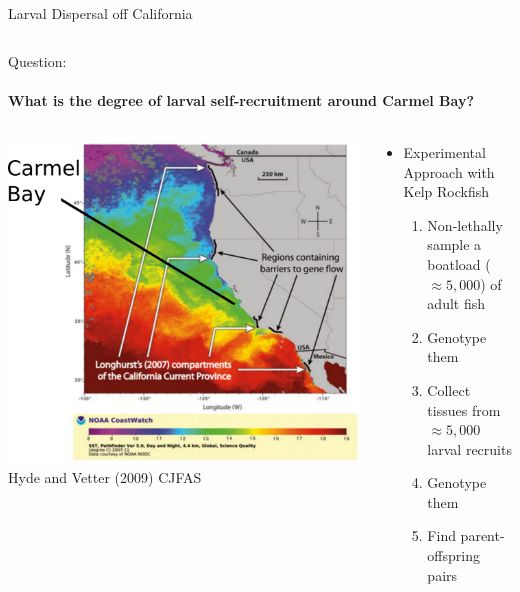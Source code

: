 \documentclass[letter,graphicx]{beamer}
\begin{document}
\begin{frame}{Larval Dispersal off California}
\begin{columns}
\begin{column}{0.55\textwidth}
\begin{itemize}
\end{itemize}

\end{column}
\end{columns}


\end{frame}








\begin{frame}{Question:}
\framesubtitle{What is the degree of larval self-recruitment around Carmel Bay?}
\begin{columns}
\begin{column}{0.45\textwidth}
\mbox{}\hspace*{-1ex}
\includegraphics[width=1.2\textwidth]{mhap_figs/vetter_coast-CB.pdf}\\
{\tiny Hyde and Vetter (2009) CJFAS}
\end{column}
\begin{column}{0.55\textwidth}  %
\begin{itemize}
\item Experimental Approach with Kelp Rockfish
\begin{enumerate}
\item Non-lethally sample a boatload ($\approx 5,000$) of adult fish
\item Genotype them
\item Collect tissues from $\approx 5,000$ larval recruits
\item Genotype them
\item Find parent-offspring pairs
\end{enumerate}
\end{itemize}
\end{column}
\end{columns}
\end{frame}
\end{document}
